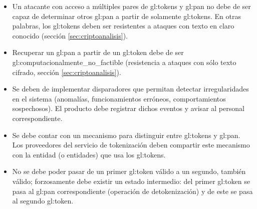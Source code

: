 \begin{itemize}

  \item Un atacante con acceso a múltiples pares de \glspl{gl:token} y
    \gls{gl:pan} no debe de ser capaz de determinar otros \gls{gl:pan} a partir
    de solamente \glspl{gl:token}. En otras palabras, los \glspl{gl:token}
    deben ser resistentes a ataques con texto en claro conocido (sección
    \ref{sec:criptoanalisis}).

  \item Recuperar un \gls{gl:pan} a partir de un \gls{gl:token} debe de ser
    \gls{gl:computacionalmente_no_factible} (resistencia a ataques con sólo
    texto cifrado, sección \ref{sec:criptoanalisis}).

  \item Se deben de implementar disparadores que permitan detectar
     irregularidades en el sistema (anomalías, funcionamientos erróneos,
     comportamientos sospechosos). El producto debe registrar dichos eventos y
     avisar al personal correspondiente.

  \item Se debe contar con un mecanismo para distinguir entre \glspl{gl:token}
    y \gls{gl:pan}. Los proveedores del servicio de tokenización deben
    compartir este mecanismo con la entidad (o entidades) que usa los
    \glspl{gl:token}.


  \item No se debe poder pasar de un primer \gls{gl:token} válido a un segundo,
    también válido; forzosamente debe existir un estado intermedio: del primer
    \gls{gl:token} se pasa al \gls{gl:pan} correspondiente (operación de
    detokenización) y de este se pasa al segundo \gls{gl:token}.


\end{itemize}
